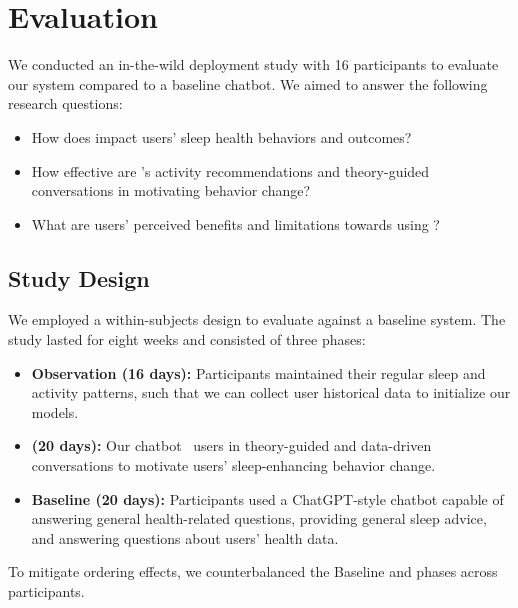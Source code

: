 \section{Evaluation}\label{sec.evaluation}

We conducted an in-the-wild deployment study with 16 participants to evaluate our system compared to a baseline chatbot. 
We aimed to answer the following research questions:
\begin{itemize}
    \item How does \name{} impact users' sleep health behaviors and outcomes?
    \item How effective are \name{}'s activity recommendations and theory-guided conversations in motivating behavior change?
    \item What are users' perceived benefits and limitations towards using \name{}?
\end{itemize}

\subsection{Study Design}\label{subsec.study_design}
We employed a within-subjects design to evaluate \name{} against a baseline system. The study lasted for eight weeks and consisted of three phases:
\begin{itemize}
    \item \textbf{Observation (16 days):} Participants maintained their regular sleep and activity patterns, such that we can collect user historical data to initialize our models.
    \item \textbf{\name{} (20 days):} Our chatbot~ users in theory-guided and data-driven conversations to motivate users' sleep-enhancing behavior change. 
    \item \textbf{Baseline (20 days):} Participants used a ChatGPT-style chatbot capable of answering general health-related questions, providing general sleep advice, and answering questions about users' health data.
\end{itemize}
To mitigate ordering effects, we counterbalanced the Baseline and \name{} phases across participants. 

